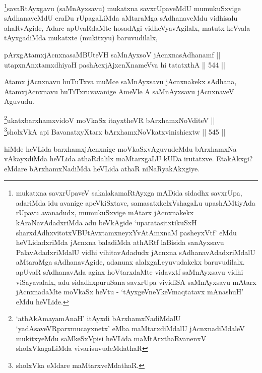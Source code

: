 \begin{artha}
\footnote{mukatxna savxrUpaveV sakalakamaRtAyxga mADida sidadhx
savxrUpa, adariMda idu avanige apeVkiSxtave, samasatxkelxVshagaLu
upashAMtiyAda rUpavu avanadudx, mumukuSxvige mAtarx jAcnxnakekx
kAraNavAdadxriMda adu beVkAgide `uparatasitxtikuSxH sharxdAdhxvitotxVBUtAvx\s \s tamxneyxYvA\s \s tAmxnaM pasheyxVtf' eMdu heVLidadxriMda jAcnxna
baladiMda athARtf laBisida sanAyxsavu PalavAdadxriMdalU vidhi
vihitavAdadudx jAcnxna sAdhanavAdadxriMdalU aMtaraMga sAdhanavAgide,
adanunx alalxgaLeyuvudakekx baruvudilalx. apUvaR sAdhanavAda
aginx hoVtarxdaMte vidavxtf saMnAyxsavu vidhi viSayavalalx, adu
sidadhxpuruSana savxrUpa vividiSA saMnAyxsavu mAtarx jAcnxnadaMte
moVkaSx heVtu - `tAyxgeVneYkeV\s maqtatavx mAnashuH' eMdu heVLide.}savaRtAyxgavu (saMnAyxsavu) mukatxna savxrUpaveMdU
mumukuSxvige sAdhanaveMdU eraDu rUpagaLiMda aMtaraMga sAdhanaveMdu
vidhisalu ahaRvAgide, Adare apUvaRdaMte hosadAgi vidheVyavAgilalx,
matutx keVvala tAyxgadiMda mukatxte (mukitxyu) baruvudilalx, 
\end{artha}

\begin{shl}
pArxgAtamxjAcnxnasaMBUteVH saMnAyxsoV jAcnxnasAdhanamf || \\
utapxnAnxtamxdhiyaH pashAcxjAjxcnXnameVva hi tatatxthA \hfill || 544 ||  
\end{shl}

\begin{artha}
Atamx jAcnxnavu huTuTxva muMce saMnAyxsavu jAcnxnakekx sAdhana,
AtamxjAcnxnavu huTiTxruvavanige AmeVle A saMnAyxsavu jAcnxnaveV\break
Aguvudu.
\end{artha}


\begin{shl}
\footnote{`athAkAmayamAnaH' itAyxdi bArxhamxNadiMdalU `yadAsaveVRparxmucayxnetx' eMba maMtarxdiMdalU jAcnxnadiMdaleV mukitxyeMdu saMkeSxVpisi heVLida maMtArxthaRvanenxV sholxVkagaLiMda vivarisuvudeMdathaR}ukatxbarxhamxvidoV moVkaSx itayxtheVR bArxhamxNoVditeV || \\
\footnote{sholxVka eMdare maMtarxveMdathaR.}sholxVkA api BavanatxyXtarx bArxhamxNoVkatxvinishicxtw \hfill || 545 ||  
\end{shl}


\begin{artha}
hiMde heVLida barxhamxjAcnxnige moVkaSxvAguvudeMdu
bArxhamxNa vAkayxdiMda heVLida athaRdalilx maMtarxgaLU kUDa
irutatxve. EtakAkxgi? eMdare bArxhamxNadiMda heVLida athaR
niNaRyakAkxgiye.
\end{artha}

